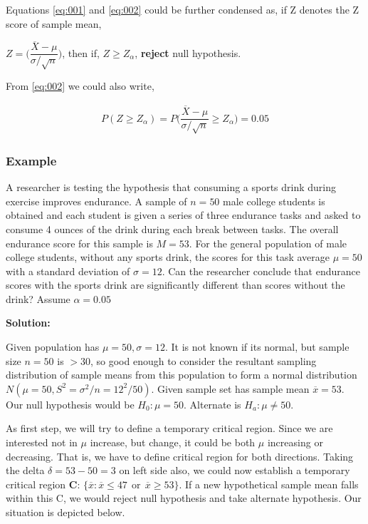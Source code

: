 \documentclass[float=false,crop=false]{standalone}
\begin{document}
Equations \ref{eq:001} and \ref{eq:002} could be further condensed as,
if Z denotes the Z score of sample mean,

\(Z = \Big(\dfrac{\overline{X} - \mu}{\sigma/\sqrt{n}}\Big)\), then if,
\(Z \geq Z_{\alpha}\), \textbf{reject} null hypothesis.

From \ref{eq:002} we could also write,

\begin{equation}
    \begin{aligned}
        P ( Z \geq Z_{\alpha} ) = P \Bigg(\dfrac{\overline{X} - \mu}{\sigma/\sqrt{n}} \geq Z_{\alpha} \Bigg) = 0.05 \label{eq:003}
    \end{aligned}
\end{equation}

    \subsubsection{Example}\label{example}

A researcher is testing the hypothesis that consuming a sports drink
during exercise improves endurance. A sample of \(n = 50\) male college
students is obtained and each student is given a series of three
endurance tasks and asked to consume 4 ounces of the drink during each
break between tasks. The overall endurance score for this sample is
\(M = 53\). For the general population of male college students, without
any sports drink, the scores for this task average \(\mu = 50\) with a
standard deviation of \(\sigma=12\). Can the researcher conclude that
endurance scores with the sports drink are significantly different than
scores without the drink? Assume \(\alpha = 0.05\)

    \textbf{Solution:}

Given population has \(\mu = 50, \sigma=12\). It is not known if its
normal, but sample size \(n=50\) is \(>30\), so good enough to consider
the resultant sampling distribution of sample means from this population
to form a normal distribution \(N(\mu=50,S^2 = \sigma^2/n = 12^2/50)\).
Given sample set has sample mean \(\overline{x} = 53\). Our null
hypothesis would be \(H_0: \mu = 50\). Alternate is
\(H_a: \mu \neq 50\).

As first step, we will try to define a temporary critical region. Since
we are interested not in \(\mu\) increase, but change, it could be both
\(\mu\) increasing or decreasing. That is, we have to define critical
region for both directions. Taking the delta \(\delta = 53-50 = 3\) on
left side also, we could now establish a temporary critical region
\textbf{C}:
\(\{ \overline{x}: \overline{x} \leq 47 \ \ \text{or} \ \ \overline{x} \geq 53\}\).
If a new hypothetical sample mean falls within this C, we would reject
null hypothesis and take alternate hypothesis. Our situation is depicted
below.
\end{document}
